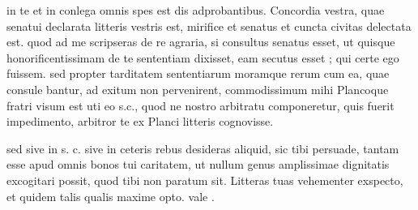 


 in te et in conlega omnis spes est dis adprobantibus. Concordia vestra, quae senatui declarata litteris vestris est, mirifice et senatus et cuncta civitas delectata est. quod ad me scripseras de re agraria, si consultus senatus esset, ut quisque honorificentissimam de te sententiam dixisset, eam secutus esset ; qui certe ego fuissem. sed propter tarditatem sententiarum moramque rerum cum ea, quae consule bantur, ad exitum non pervenirent, commodissimum mihi Plancoque fratri visum est uti eo s.c., quod ne nostro arbitratu componeretur, quis fuerit impedimento, arbitror te ex Planci litteris cognovisse.

 sed sive in s. c. sive in ceteris rebus desideras aliquid, sic tibi persuade, tantam esse apud omnis bonos tui caritatem, ut nullum genus amplissimae dignitatis excogitari possit, quod tibi non paratum sit. Litteras tuas vehementer exspecto, et quidem talis qualis maxime opto. vale .
